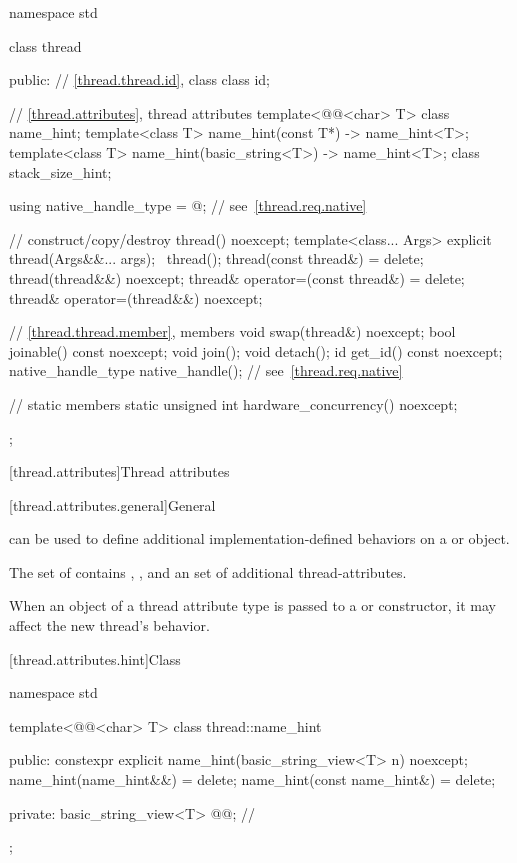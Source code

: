 %
\begin{codeblock}
namespace std {
  class thread {
  public:
    // \ref{thread.thread.id}, class 
    class id;

    // \ref{thread.attributes}, thread attributes
    template<@@<char> T>
      class name_hint;
    template<class T>
      name_hint(const T*) -> name_hint<T>;
    template<class T>
      name_hint(basic_string<T>) -> name_hint<T>;
    class stack_size_hint;

    using native_handle_type = @\impdefnc@;         // see~\ref{thread.req.native}

    // construct/copy/destroy
    thread() noexcept;
    template<class... Args>
      explicit thread(Args&&... args);
    ~thread();
    thread(const thread&) = delete;
    thread(thread&&) noexcept;
    thread& operator=(const thread&) = delete;
    thread& operator=(thread&&) noexcept;

    // \ref{thread.thread.member}, members
    void swap(thread&) noexcept;
    bool joinable() const noexcept;
    void join();
    void detach();
    id get_id() const noexcept;
    native_handle_type native_handle();                         // see~\ref{thread.req.native}

    // static members
    static unsigned int hardware_concurrency() noexcept;
  };
}
\end{codeblock}

[thread.attributes]{Thread attributes}

[thread.attributes.general]{General}

\pnum
{}
can be used to define additional implementation-defined behaviors
on a  or  object.

\pnum
The set of  contains
,
, and
an  set of additional thread-attributes.

\pnum
When an object of a thread attribute type is passed to
a  or  constructor,
it may affect the new thread's behavior.

[thread.attributes.hint]{Class }

%
\begin{codeblock}
namespace std {
  template<@@<char> T>
  class thread::name_hint {
  public:
    constexpr explicit name_hint(basic_string_view<T> n) noexcept;
    name_hint(name_hint&&) = delete;
    name_hint(const name_hint&) = delete;

  private:
    basic_string_view<T> @@;  // \expos
  };
}
\end{codeblock}

